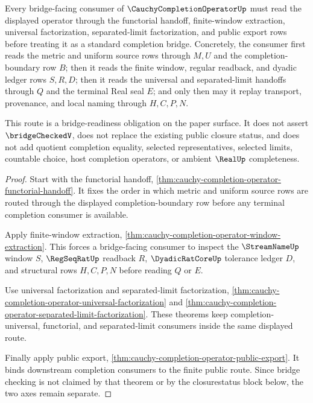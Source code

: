 \begin{theorem}
\label{thm:cauchy-completion-operator-bridge-route}
Every bridge-facing consumer of $\CauchyCompletionOperatorUp$ must read the displayed operator through the functorial handoff, finite-window extraction, universal factorization, separated-limit factorization, and public export rows before treating it as a standard completion bridge. Concretely, the consumer first reads the metric and uniform source rows through $M,U$ and the completion-boundary row $B$; then it reads the finite window, regular readback, and dyadic ledger rows $S,R,D$; then it reads the universal and separated-limit handoffs through $Q$ and the terminal Real seal $E$; and only then may it replay transport, provenance, and local naming through $H,C,P,N$.

This route is a bridge-readiness obligation on the paper surface. It does not assert $\bridgeCheckedV$, does not replace the existing public closure status, and does not add quotient completion equality, selected representatives, selected limits, countable choice, host completion operators, or ambient $\RealUp$ completeness.
\end{theorem}
\begin{proof}
Start with the functorial handoff, \autoref{thm:cauchy-completion-operator-functorial-handoff}. It fixes the order in which metric and uniform source rows are routed through the displayed completion-boundary row before any terminal completion consumer is available.

Apply finite-window extraction, \autoref{thm:cauchy-completion-operator-window-extraction}. This forces a bridge-facing consumer to inspect the $\StreamNameUp$ window $S$, $\RegSeqRatUp$ readback $R$, $\DyadicRatCoreUp$ tolerance ledger $D$, and structural rows $H,C,P,N$ before reading $Q$ or $E$.

Use universal factorization and separated-limit factorization, \autoref{thm:cauchy-completion-operator-universal-factorization} and \autoref{thm:cauchy-completion-operator-separated-limit-factorization}. These theorems keep completion-universal, functorial, and separated-limit consumers inside the same displayed route.

Finally apply public export, \autoref{thm:cauchy-completion-operator-public-export}. It binds downstream completion consumers to the finite public route. Since bridge checking is not claimed by that theorem or by the closurestatus block below, the two axes remain separate.
\end{proof}

